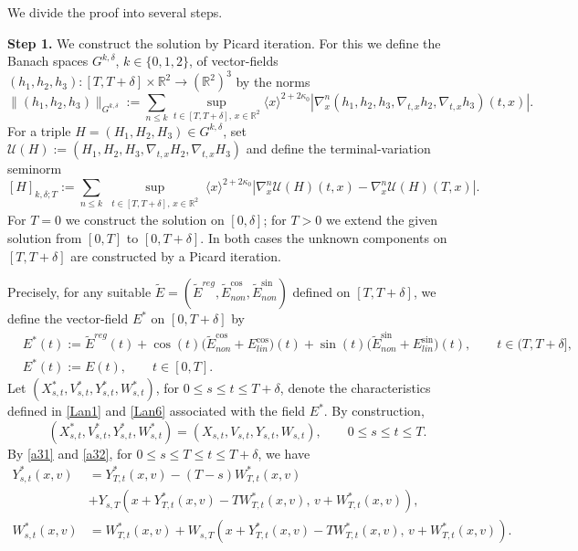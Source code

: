 \documentclass[reqno,11pt]{amsart}
\numberwithin{equation}{section}
\def\R{{\mathbb R}}
\def\R{{\bf R}}
\def\R{\mathbb{R}}
\begin{document}
	We divide the proof into several steps.
	\medskip

	\textbf{Step 1.} We construct the solution by Picard iteration. For this we define the Banach spaces $G^{k,\delta}$, $k\in\{0,1,2\}$, of vector-fields $(h_1,h_2,h_3): [T,T+\delta]\times\R^2\to(\R^2)^3$ by the norms
	\begin{equation}\label{sec7eq1}
		\|(h_1,h_2,h_3)\|_{G^{k,\delta}}:= \sum_{n\leq k}\sup_{t\in[T,T+\delta],\,x\in \mathbb{R}^2}\langle x\rangle^{2+2\kappa_0}|\nabla_x^n(h_1,h_2,h_3,\nabla_{t,x}h_2,\nabla_{t,x}h_3)(t,x)|.
	\end{equation}
	For a triple $H=(H_1,H_2,H_3)\in G^{k,\delta}$, set $\mathcal U(H):=
	(H_1,H_2,H_3,\nabla_{t,x}H_2,\nabla_{t,x}H_3)$
	and define the terminal-variation seminorm
	\begin{equation}\label{sec7eq2}
	[H]_{k,\delta;T}:=\sum_{n\leq k}
	\sup_{\substack{t\in[T,T+\delta],\,x\in\mathbb R^2}}
	\langle x\rangle^{2+2\kappa_0}
	\left|\nabla_x^n\mathcal U(H)(t,x)-
	\nabla_x^n\mathcal U(H)(T,x)\right|.
	\end{equation}
For $T=0$ we construct the solution on $[0,\delta]$; for
	$T>0$ we extend the given solution from $[0,T]$ to $[0,T+\delta]$.
	In both cases the unknown components on $[T,T+\delta]$ are constructed by
	a Picard iteration.
	
	Precisely, for any suitable $\tilde E=(\tilde{E}^{reg},\tilde{E}^{\cos}_{non},\tilde{E}^{\sin}_{non})$ defined on $[T,T+\delta]$, we define the vector-field $E^\ast$ on $[0,T+\delta]$ by
	\begin{equation}\label{sec7eq3}
	\begin{split}
	&E^\ast(t):=\widetilde{E}^{reg}(t)+\cos(t)\bigl(\widetilde{E}^{\cos}_{non}+E_{lin}^{\cos}\bigr)(t)
		+\sin(t)\bigl(\widetilde{E}^{\sin}_{non}+E_{lin}^{\sin}\bigr)(t),
		\qquad t\in (T,T+\delta],\\
	&E^\ast(t):=E(t),\qquad t\in [0,T].
	\end{split}
	\end{equation}
		Let $(X_{s,t}^\ast,V_{s,t}^\ast,Y_{s,t}^\ast,W_{s,t}^\ast)$, for $0\le s\le t\le T+\delta$, denote the characteristics defined in \eqref{Lan1} and \eqref{Lan6} associated with the field $E^\ast$. By construction,
	\begin{equation}\label{sec7eq5}
		(X_{s,t}^\ast,V_{s,t}^\ast,Y_{s,t}^\ast,W_{s,t}^\ast)=(X_{s,t},V_{s,t},Y_{s,t},W_{s,t}),
		\qquad 0\le s\le t\le T.
	\end{equation}
	By \eqref{a31} and \eqref{a32}, for $0\le s\le T\le t\le T+\delta$, we have
	\begin{equation}\label{a31'}
	\begin{split}
		Y_{s,t}^\ast(x,v)
		&=Y_{T,t}^\ast(x,v)-(T-s)W_{T,t}^\ast(x,v)\\
		&+Y_{s,T}(x+Y_{T,t}^\ast(x,v)-TW_{T,t}^\ast(x,v),\,v+W_{T,t}^\ast(x,v)),\\
		W_{s,t}^\ast(x,v)&=W_{T,t}^\ast(x,v)+W_{s,T}(x+Y_{T,t}^\ast(x,v)-TW_{T,t}^\ast(x,v),\,v+W_{T,t}^\ast(x,v)).
		\end{split}
	\end{equation}
\end{document}
